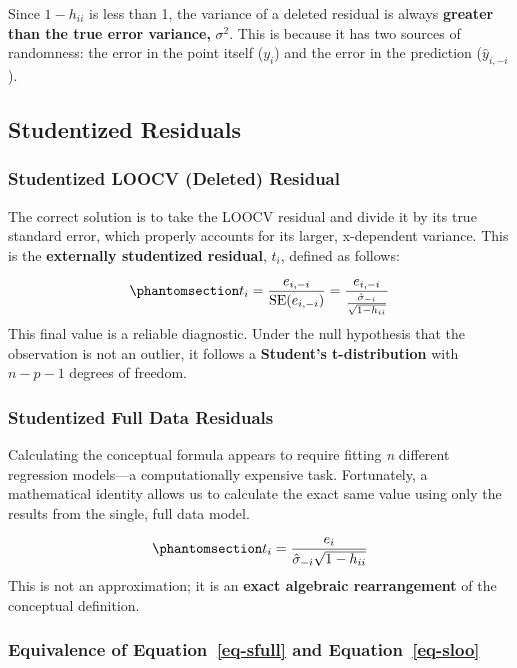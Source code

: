 \documentclass[
  letterpaper,
  DIV=11,
  numbers=noendperiod]{scrreprt}
\begin{document}
Since \(1-h_{ii}\) is less than 1, the variance of a deleted residual is
always \textbf{greater than the true error variance,} \(\sigma^2\). This
is because it has two sources of randomness: the error in the point
itself (\(y_i\)) and the error in the prediction (\(\hat{y}_{i,-i}\)).

\subsection{Studentized Residuals}\label{studentized-residuals}

\subsubsection{Studentized LOOCV (Deleted)
Residual}\label{studentized-loocv-deleted-residual}

The correct solution is to take the LOOCV residual and divide it by its
true standard error, which properly accounts for its larger, x-dependent
variance. This is the \textbf{externally studentized residual}, \(t_i\),
defined as follows:

\begin{equation}\phantomsection\label{eq-sloo}{
t_i = \frac{e_{i,-i}}{\text{SE}(e_{i,-i})} = \frac{e_{i,-i}}{\frac{\hat{\sigma}_{-i}}{\sqrt{1-h_{ii}}}}
}\end{equation} This final value is a reliable diagnostic. Under the
null hypothesis that the observation is not an outlier, it follows a
\textbf{Student's t-distribution} with \(n - p - 1\) degrees of freedom.

\subsubsection{Studentized Full Data
Residuals}\label{studentized-full-data-residuals}

Calculating the conceptual formula appears to require fitting \emph{n}
different regression models---a computationally expensive task.
Fortunately, a mathematical identity allows us to calculate the exact
same value using only the results from the single, full data model.

\begin{equation}\phantomsection\label{eq-sfull}{
t_i = \frac{e_i}{\hat{\sigma}_{-i}\sqrt{1 - h_{ii}}}
}\end{equation} This is not an approximation; it is an \textbf{exact
algebraic rearrangement} of the conceptual definition.

\subsubsection{\texorpdfstring{Equivalence of Equation~\ref{eq-sfull}
and
Equation~\ref{eq-sloo}}{Equivalence of Equation~ and Equation~}}\label{equivalence-of-eq-sfull-and-eq-sloo}
\end{document}
